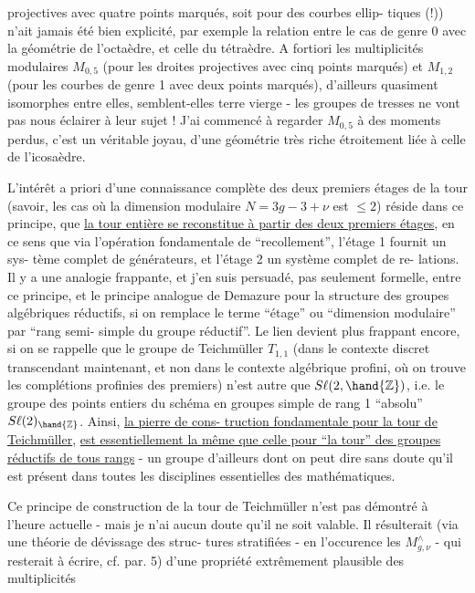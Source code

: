 
projectives avec quatre points marqués, soit pour des courbes ellip-%
tiques (!)) n'ait jamais été bien explicité, par exemple la relation
entre le cas de genre 0 avec la géométrie de l'octaèdre, et celle du
tétraèdre. A fortiori les multiplicités modulaires $M_{0,5}$ (pour les
droites projectives avec cinq points marqués) et $M_{1,2}$ (pour les
courbes de genre 1 avec deux points marqués), d'ailleurs quasiment
isomorphes entre elles, semblent-elles terre vierge - les groupes
de tresses ne vont pas nous éclairer à leur sujet ! J'ai commencé à
regarder $M_{0,5}$ à des moments perdus, c'est un véritable joyau, d'une
géométrie très riche étroitement liée à celle de l'icosaèdre.

L'intérêt a priori d'une connaissance complète des deux
premiers étages de la tour (savoir, les cas où la dimension modulaire
$N = 3g-3+\nu$ est $\leq 2$) réside dans ce principe, que \uline{la tour entière se
reconstitue à partir des deux premiers étages}, en ce sens que via
l'opération fondamentale de ``recollement'', l'étage 1 fournit un sys-%
tème complet de générateurs, et l'étage 2 un système complet de re-%
lations. Il y a une analogie frappante, et j'en suis persuadé, pas
seulement formelle, entre ce principe, et le principe analogue de
Demazure pour la structure des groupes algébriques réductifs, si on
remplace le terme ``étage'' ou ``dimension modulaire'' par ``rang semi-%
simple du groupe réductif''. Le lien devient plus frappant encore,
si on se rappelle que le groupe de Teichmüller $T_{1,1}$ (dans le contexte
discret transcendant maintenant, et non dans le contexte algébrique
profini, où on trouve les complétions profinies des premiers) n'est
autre que $S\ell(2,\hand{\mathbb{Z}})$, i.e. le groupe des points entiers du schéma en
groupes simple de rang 1 ``absolu'' $S\ell(2)_{\hand{\mathbb{Z}}}$. Ainsi, \uline{la pierre de cons-%
truction fondamentale pour la tour de Teichmüller}, \uline{est essentiellement
la même que celle pour ``la tour'' des groupes réductifs de tous rangs} -
un groupe d'ailleurs dont on peut dire sans doute qu'il est présent
dans toutes les disciplines essentielles des mathématiques.

Ce principe de construction de la tour de Teichmüller n'est
pas démontré à l'heure actuelle - mais je n'ai aucun doute qu'il ne
soit valable. Il résulterait (via une théorie de dévissage des struc-%
tures stratifiées - en l'occurence les $M^{\wedge}_{g,\nu}$ - qui resterait à écrire,
cf. par. 5) d'une propriété extrêmement plausible des multiplicités

